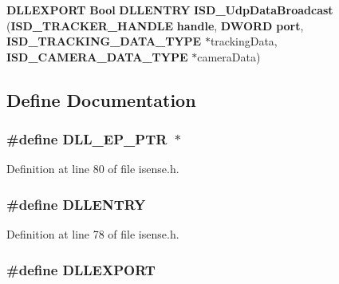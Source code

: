 \begin{DoxyCompactItemize}
\item 
{\bf \-D\-L\-L\-E\-X\-P\-O\-R\-T} {\bf \-Bool} {\bf \-D\-L\-L\-E\-N\-T\-R\-Y} {\bf \-I\-S\-D\-\_\-\-Udp\-Data\-Broadcast} ({\bf \-I\-S\-D\-\_\-\-T\-R\-A\-C\-K\-E\-R\-\_\-\-H\-A\-N\-D\-L\-E} {\bf handle}, {\bf \-D\-W\-O\-R\-D} {\bf port}, {\bf \-I\-S\-D\-\_\-\-T\-R\-A\-C\-K\-I\-N\-G\-\_\-\-D\-A\-T\-A\-\_\-\-T\-Y\-P\-E} $\ast$tracking\-Data, {\bf \-I\-S\-D\-\_\-\-C\-A\-M\-E\-R\-A\-\_\-\-D\-A\-T\-A\-\_\-\-T\-Y\-P\-E} $\ast$camera\-Data)
\end{DoxyCompactItemize}


\subsection{\-Define \-Documentation}
\subsubsection[{\-D\-L\-L\-\_\-\-E\-P\-\_\-\-P\-T\-R}]{\setlength{\rightskip}{0pt plus 5cm}\#define {\bf \-D\-L\-L\-\_\-\-E\-P\-\_\-\-P\-T\-R}~$\ast$}\label{isense_8h_a08d249afe8e68ce59f594b70f9f00d45}


\-Definition at line 80 of file isense.\-h.

\subsubsection[{\-D\-L\-L\-E\-N\-T\-R\-Y}]{\setlength{\rightskip}{0pt plus 5cm}\#define {\bf \-D\-L\-L\-E\-N\-T\-R\-Y}}\label{isense_8h_a15b3c559faad92d04a6035e9ecff7587}


\-Definition at line 78 of file isense.\-h.

\subsubsection[{\-D\-L\-L\-E\-X\-P\-O\-R\-T}]{\setlength{\rightskip}{0pt plus 5cm}\#define {\bf \-D\-L\-L\-E\-X\-P\-O\-R\-T}}\label{isense_8h_a808e08638be3cba36e36759e5b150de0}


